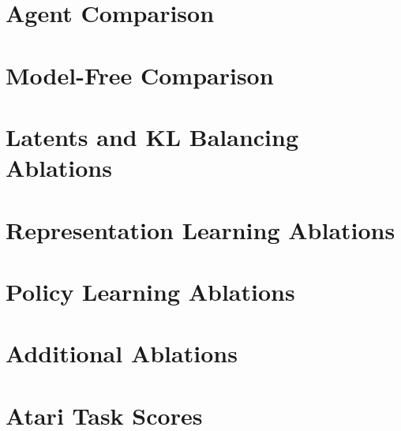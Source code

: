 \clearpage
\vspace*{-8ex}
\section{Agent Comparison}


\clearpage
\vspace*{-9ex}
\section{Model-Free Comparison}
\vspace*{-2ex}


\clearpage
\vspace*{-9ex}
\section{Latents and KL Balancing Ablations}
\vspace*{-2ex}


\clearpage
\vspace*{-9ex}
\section{Representation Learning Ablations}
\vspace*{-2ex}


\clearpage
\vspace*{-9ex}
\section{Policy Learning Ablations}
\vspace*{-2ex}


\clearpage
\vspace*{-9ex}
\section{Additional Ablations}
\vspace*{-2ex}


\clearpage
\vspace*{-9ex}
\section{Atari Task Scores}
\vspace*{-2ex}

